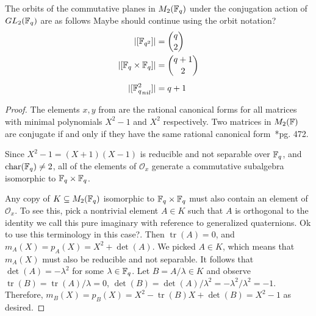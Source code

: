 \documentclass{amsart}
\begin{document}
\begin{theorem}\label{plane-counts}
    The orbits of the commutative planes in $M_2(\protect\mathbb{F}_q)$ under the conjugation action of $GL_2(\protect\mathbb{F}_q)$ are as follows {\color{blue} Maybe should continue using the orbit notation?}
    \begin{align}
        |[\protect\mathbb{F}_{q^2}]|                   &= \binom{q}{2} \\
        |[\protect\mathbb{F}_q \times \protect\mathbb{F}_q]|          &= \binom{q + 1}{2} \\[0.5em]
        |[{\protect\mathbb{F}_q^2}_{nil}]|             &= q + 1
    \end{align}
\end{theorem}
\begin{proof}
    The elements $x, y$ from  are the rational canonical forms for all matrices with minimal polynomials $X^2 - 1$ and $X^2$ respectively. Two matrices in $M_2(\protect\mathbb{F})$ are conjugate if and only if they have the same rational canonical form~\cite{DandF}*{pg. 472}.

    Since $X^2 - 1 = (X + 1)(X - 1)$ is reducible and not separable over $\protect\mathbb{F}_q$, and $\operatorname{char}(\protect\mathbb{F}_q) \neq 2$, all of the elements of $\mathcal{O}_x$ generate a commutative subalgebra isomorphic to $\protect\mathbb{F}_q \times \protect\mathbb{F}_q$.

    Any copy of $K \subseteq M_2(\protect\mathbb{F}_q)$ isomorphic to $\protect\mathbb{F}_q \times \protect\mathbb{F}_q$ must also contain an element of $\mathcal{O}_x$. To see this, pick a nontrivial element $A \in K$ such that $A$ is orthogonal to the identity {\color{blue} we call this pure imaginary with reference to generalized quaternions. Ok to use this terminology in this case?}. Then $\operatorname{tr}(A) = 0$, and $m_A(X) = p_A(X) = X^2 + \det(A)$. We picked $A \in K$, which means that $m_A(X)$ must also be reducible and not separable. It follows that $\det(A) = -\lambda^2$ for some $\lambda \in \protect\mathbb{F}_q$. Let $B = A/\lambda \in K$ and observe $\operatorname{tr}(B) = \operatorname{tr}(A)/\lambda = 0$, $\det(B) = \det(A)/\lambda^2 = -\lambda^2/\lambda^2 = -1$. Therefore, $m_B(X) = p_B(X) = X^2 -\operatorname{tr}(B) X + \det(B) = X^2 -1$ as desired.


\end{proof}
\end{document}
